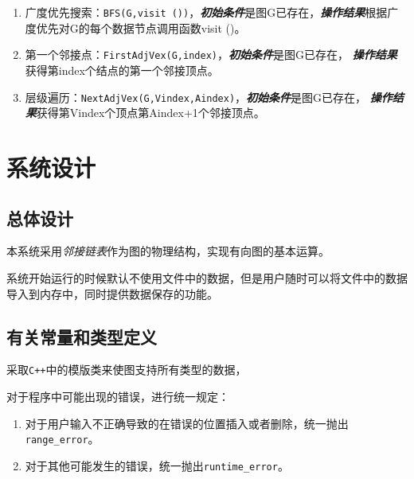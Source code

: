 \begin{enumerate}
\item 广度优先搜索：\texttt{BFS(G,visit ())}，\newline \textbf{\emph{初始条件}}是图G已存在，\newline \textbf{\emph{操作结果}}根据广度优先对G的每个数据节点调用函数visit ()。
\item 第一个邻接点：\texttt{FirstAdjVex(G,index)}，\newline \textbf{\emph{初始条件}}是图G已存在，\newline
    \textbf{\emph{操作结果}}获得第index个结点的第一个邻接顶点。
\item 层级遍历：\texttt{NextAdjVex(G,Vindex,Aindex)}，\newline \textbf{\emph{初始条件}}是图G已存在，\newline
    \textbf{\emph{操作结果}}获得第Vindex个顶点第Aindex+1个邻接顶点。
\end{enumerate}

\section{系统设计}
\subsection{总体设计}
本系统采用\emph{邻接链表}作为图的物理结构，实现有向图的基本运算。
\par
系统开始运行的时候默认不使用文件中的数据，但是用户随时可以将文件中的数据导入到内存中，同时提供数据保存的功能。
\subsection{有关常量和类型定义}
采取\texttt{C++}中的模版类来使图支持所有类型的数据，
\par
对于程序中可能出现的错误，进行统一规定：
\begin{enumerate}
    \item 对于用户输入不正确导致的在错误的位置插入或者删除，统一抛出\texttt{range\_error}。
    \item 对于其他可能发生的错误，统一抛出\texttt{runtime\_error}。
\end{enumerate}
